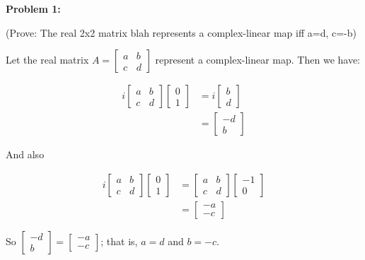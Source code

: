 \documentclass[a4paper,12pt]{article}
\begin{document}
{\bf Problem 1:}

(Prove: The real 2x2 matrix blah represents a complex-linear map iff a=d, c=-b)

Let the real matrix $A = \left[\begin{smallmatrix}a&b\\ c&d \end{smallmatrix}\right]$ represent a complex-linear map. Then we have:

\begin{align*}
i\left[\begin{smallmatrix}a&b\\ c&d \end{smallmatrix}\right]\left[\begin{smallmatrix}0\\ 1 \end{smallmatrix}\right] &= i\left[\begin{smallmatrix}b\\ d \end{smallmatrix}\right]\\
&= \left[\begin{smallmatrix}-d\\ b \end{smallmatrix}\right]
\end{align*}

And also

\begin{align*}
i\left[\begin{smallmatrix}a&b\\ c&d \end{smallmatrix}\right]\left[\begin{smallmatrix}0\\ 1 \end{smallmatrix}\right] &= \left[\begin{smallmatrix}a&b\\c&d\end{smallmatrix}\right]\left[\begin{smallmatrix}-1\\ 0 \end{smallmatrix}\right]\\
&= \left[\begin{smallmatrix}-a\\ -c \end{smallmatrix}\right]
\end{align*}

So $\left[\begin{smallmatrix}-d\\ b \end{smallmatrix}\right] = \left[\begin{smallmatrix}-a\\ -c \end{smallmatrix}\right]$; that is, $a=d$ and $b=-c$.
\end{document}
